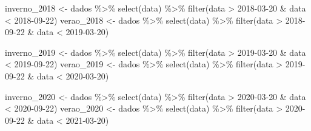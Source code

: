 \documentclass[
]{article}
\newenvironment{Shaded}{\begin{snugshade}}{\end{snugshade}}
\newcommand{\FunctionTok}[1]{\textcolor[rgb]{0.00,0.00,0.00}{#1}}
\newcommand{\NormalTok}[1]{#1}
\newcommand{\OtherTok}[1]{\textcolor[rgb]{0.56,0.35,0.01}{#1}}
\newcommand{\SpecialCharTok}[1]{\textcolor[rgb]{0.00,0.00,0.00}{#1}}
\newcommand{\StringTok}[1]{\textcolor[rgb]{0.31,0.60,0.02}{#1}}
\begin{document}
\begin{Shaded}
\begin{Highlighting}[]
\NormalTok{inverno\_2018 }\OtherTok{\textless{}{-}}\NormalTok{ dados }\SpecialCharTok{\%\textgreater{}\%} \FunctionTok{select}\NormalTok{(data) }\SpecialCharTok{\%\textgreater{}\%} \FunctionTok{filter}\NormalTok{(data }\SpecialCharTok{\textgreater{}} \StringTok{\textquotesingle{}2018{-}03{-}20\textquotesingle{}} \SpecialCharTok{\&}\NormalTok{ data }\SpecialCharTok{\textless{}} \StringTok{\textquotesingle{}2018{-}09{-}22\textquotesingle{}}\NormalTok{)}
\NormalTok{verao\_2018 }\OtherTok{\textless{}{-}}\NormalTok{ dados }\SpecialCharTok{\%\textgreater{}\%} \FunctionTok{select}\NormalTok{(data) }\SpecialCharTok{\%\textgreater{}\%}  \FunctionTok{filter}\NormalTok{(data }\SpecialCharTok{\textgreater{}} \StringTok{\textquotesingle{}2018{-}09{-}22\textquotesingle{}} \SpecialCharTok{\&}\NormalTok{ data }\SpecialCharTok{\textless{}} \StringTok{\textquotesingle{}2019{-}03{-}20\textquotesingle{}}\NormalTok{)}

\NormalTok{inverno\_2019 }\OtherTok{\textless{}{-}}\NormalTok{ dados }\SpecialCharTok{\%\textgreater{}\%} \FunctionTok{select}\NormalTok{(data) }\SpecialCharTok{\%\textgreater{}\%} \FunctionTok{filter}\NormalTok{(data }\SpecialCharTok{\textgreater{}} \StringTok{\textquotesingle{}2019{-}03{-}20\textquotesingle{}} \SpecialCharTok{\&}\NormalTok{ data }\SpecialCharTok{\textless{}} \StringTok{\textquotesingle{}2019{-}09{-}22\textquotesingle{}}\NormalTok{)}
\NormalTok{verao\_2019 }\OtherTok{\textless{}{-}}\NormalTok{ dados }\SpecialCharTok{\%\textgreater{}\%} \FunctionTok{select}\NormalTok{(data) }\SpecialCharTok{\%\textgreater{}\%}  \FunctionTok{filter}\NormalTok{(data }\SpecialCharTok{\textgreater{}} \StringTok{\textquotesingle{}2019{-}09{-}22\textquotesingle{}} \SpecialCharTok{\&}\NormalTok{ data }\SpecialCharTok{\textless{}} \StringTok{\textquotesingle{}2020{-}03{-}20\textquotesingle{}}\NormalTok{)}

\NormalTok{inverno\_2020 }\OtherTok{\textless{}{-}}\NormalTok{ dados }\SpecialCharTok{\%\textgreater{}\%} \FunctionTok{select}\NormalTok{(data) }\SpecialCharTok{\%\textgreater{}\%} \FunctionTok{filter}\NormalTok{(data }\SpecialCharTok{\textgreater{}} \StringTok{\textquotesingle{}2020{-}03{-}20\textquotesingle{}} \SpecialCharTok{\&}\NormalTok{ data }\SpecialCharTok{\textless{}} \StringTok{\textquotesingle{}2020{-}09{-}22\textquotesingle{}}\NormalTok{)}
\NormalTok{verao\_2020 }\OtherTok{\textless{}{-}}\NormalTok{ dados }\SpecialCharTok{\%\textgreater{}\%} \FunctionTok{select}\NormalTok{(data) }\SpecialCharTok{\%\textgreater{}\%}  \FunctionTok{filter}\NormalTok{(data }\SpecialCharTok{\textgreater{}} \StringTok{\textquotesingle{}2020{-}09{-}22\textquotesingle{}} \SpecialCharTok{\&}\NormalTok{ data }\SpecialCharTok{\textless{}} \StringTok{\textquotesingle{}2021{-}03{-}20\textquotesingle{}}\NormalTok{)}
\end{Highlighting}
\end{Shaded}
\end{document}
